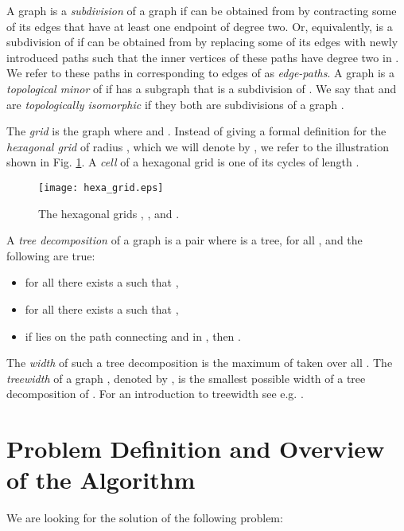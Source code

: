 \documentclass{llncs}
\begin{document}
A graph  is a \emph{subdivision} of a graph  if  can be obtained from 
by contracting some of its edges that have at least one endpoint of degree two.
Or, equivalently,  is a subdivision of  if  can be obtained from  by
replacing some of its edges with newly introduced paths
such that the inner vertices of these paths have degree two in .
We refer to these paths in  corresponding to edges of  as \emph{edge-paths}.
A graph  is a \emph{topological minor} of  if  has a subgraph that is a subdivision of .
We say that  and  are \emph{topologically isomorphic} if they both are subdivisions of a graph .

The  \emph{grid} is the graph  where
 and
.
Instead of giving a formal definition for the \emph{hexagonal grid} of radius ,
which we will denote by , we refer to the illustration shown in Fig. \ref{fig_hexa}.
A \emph{cell} of a hexagonal grid is one of its cycles of length .

\begin{figure}[t]
\begin{center}
\texttt{[image: hexa\_grid.eps]}
\end{center}
\caption{The hexagonal grids , , and .}
\label{fig_hexa}
\end{figure}

A \emph{tree decomposition} of a graph  is a pair  where
 is a tree,  for all , and the following are true:

\begin{itemize}
\item
for all  there exists a  such that ,
\item
for all  there exists a  such that ,
\item
if  lies on the path connecting  and  in , then
.
\end{itemize}

The \emph{width} of such a tree decomposition is the maximum of  taken over all .
The \emph{treewidth} of a graph , denoted by ,
is the smallest possible width of a tree decomposition of .
For an introduction to treewidth see e.g. \cite{bod97,die00}.

\section{Problem Definition and Overview of the Algorithm}
\label{algo_sketch}
We are looking for the solution of the following problem:
\end{document}
